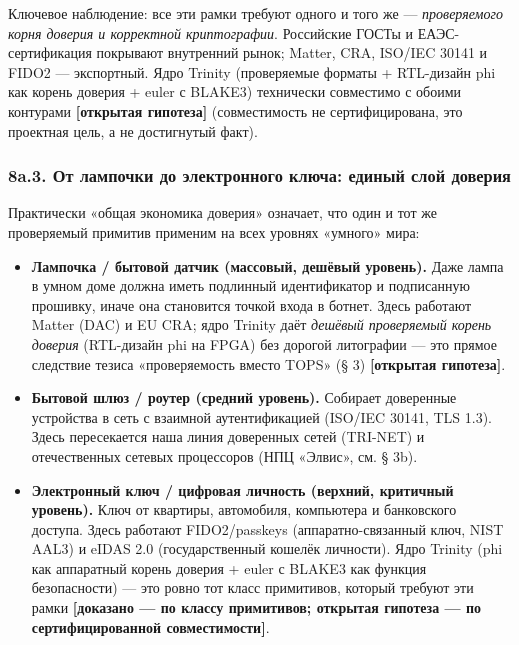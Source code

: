 \documentclass[
  russian,
]{article}
\providecommand{\tightlist}{%
  \setlength{\itemsep}{0pt}\setlength{\parskip}{0pt}}
\begin{document}
Ключевое наблюдение: все эти рамки требуют одного и того же ---
\emph{проверяемого корня доверия и корректной криптографии}. Российские
ГОСТы и ЕАЭС-сертификация покрывают внутренний рынок; Matter, CRA,
ISO/IEC 30141 и FIDO2 --- экспортный. Ядро Trinity (проверяемые форматы
+ RTL-дизайн phi как корень доверия + euler с BLAKE3) технически совместимо с
обоими контурами \textbf{{[}открытая гипотеза{]}} (совместимость не
сертифицирована, это проектная цель, а не достигнутый факт).

\subsubsection{8a.3. От лампочки до электронного ключа: единый слой
доверия}\label{a.3.-ux43eux442-ux43bux430ux43cux43fux43eux447ux43aux438-ux434ux43e-ux44dux43bux435ux43aux442ux440ux43eux43dux43dux43eux433ux43e-ux43aux43bux44eux447ux430-ux435ux434ux438ux43dux44bux439-ux441ux43bux43eux439-ux434ux43eux432ux435ux440ux438ux44f}

Практически «общая экономика доверия» означает, что один и тот же
проверяемый примитив применим на всех уровнях «умного» мира:

\begin{itemize}
\tightlist
\item
  \textbf{Лампочка / бытовой датчик (массовый, дешёвый уровень).} Даже
  лампа в умном доме должна иметь подлинный идентификатор и подписанную
  прошивку, иначе она становится точкой входа в ботнет. Здесь работают
  Matter (DAC) и EU CRA; ядро Trinity даёт \emph{дешёвый проверяемый
  корень доверия} (RTL-дизайн phi на FPGA) без дорогой литографии --- это прямое
  следствие тезиса «проверяемость вместо TOPS» (§ 3) \textbf{{[}открытая
  гипотеза{]}}.
\item
  \textbf{Бытовой шлюз / роутер (средний уровень).} Собирает доверенные
  устройства в сеть с взаимной аутентификацией (ISO/IEC 30141, TLS 1.3).
  Здесь пересекается наша линия доверенных сетей (TRI-NET) и
  отечественных сетевых процессоров (НПЦ «Элвис», см. § 3b).
\item
  \textbf{Электронный ключ / цифровая личность (верхний, критичный
  уровень).} Ключ от квартиры, автомобиля, компьютера и банковского
  доступа. Здесь работают FIDO2/passkeys (аппаратно-связанный ключ, NIST
  AAL3) и eIDAS 2.0 (государственный кошелёк личности). Ядро Trinity
  (phi как аппаратный корень доверия + euler с BLAKE3 как функция
  безопасности) --- это ровно тот класс примитивов, который требуют эти
  рамки \textbf{{[}доказано --- по классу примитивов; открытая гипотеза
  --- по сертифицированной совместимости{]}}.
\end{itemize}
\end{document}
